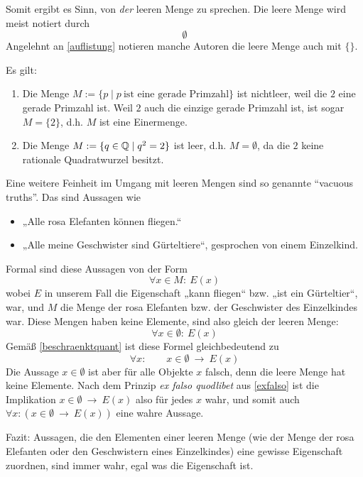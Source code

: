\begin{nota}
    Somit ergibt es Sinn, von \emph{der} leeren Menge zu sprechen. Die leere Menge wird meist notiert durch
        \[ \emptyset \]
    Angelehnt an \cref{auflistung} notieren manche Autoren die leere Menge auch mit $\{\}$.
\end{nota}


\begin{bsp}
    Es gilt:
    \begin{enumerate}
        \item Die Menge $M:=\{p\mid p\ \text{ist eine gerade Primzahl}\}$ ist nichtleer, weil die $2$ eine gerade Primzahl ist. Weil $2$ auch die einzige gerade Primzahl ist, ist sogar $M=\{2\}$, d.h. $M$ ist eine Einermenge.
        \item Die Menge $M:= \{ q\in \mathbb Q\mid q^2=2\}$ ist leer, d.h. $M=\emptyset$, da die $2$ keine rationale Quadratwurzel besitzt.
    \end{enumerate}
\end{bsp}


\begin{bem} \label{vacuoustruth} 
    Eine weitere Feinheit im Umgang mit leeren Mengen sind so genannte ``vacuous truths''. Das sind Aussagen wie
    \begin{itemize}
        \item „Alle rosa Elefanten können fliegen.“
        \item „Alle meine Geschwister sind Gürteltiere“, gesprochen von einem Einzelkind.
    \end{itemize}	
    Formal sind diese Aussagen von der Form
        \[ \forall x\in M:\ E(x) \]
    wobei $E$ in unserem Fall die Eigenschaft „kann fliegen“ bzw. „ist ein Gürteltier“, war, und $M$ die Menge der rosa Elefanten bzw. der Geschwister des Einzelkindes war. Diese Mengen haben keine Elemente, sind also gleich der leeren Menge:
        \[ \forall x\in \emptyset:\ E(x) \]
    Gemäß \cref{beschraenktquant} ist diese Formel gleichbedeutend zu
        \[ \forall x:\qquad x\in \emptyset\ \to\ E(x) \]
    Die Aussage $x\in\emptyset$ ist aber für alle Objekte $x$ falsch, denn die leere Menge hat keine Elemente. Nach dem Prinzip \emph{ex falso quodlibet} aus \cref{exfalso} ist die Implikation $x\in \emptyset\ \to\ E(x)$ also für jedes $x$ wahr, und somit auch $\forall x: \left(x\in \emptyset\ \to\ E(x)\right)$ eine wahre Aussage.
	
    Fazit: Aussagen, die den Elementen einer leeren Menge (wie der Menge der rosa Elefanten oder den Geschwistern eines Einzelkindes) eine gewisse Eigenschaft zuordnen, sind immer wahr, egal was die Eigenschaft ist.
\end{bem}


